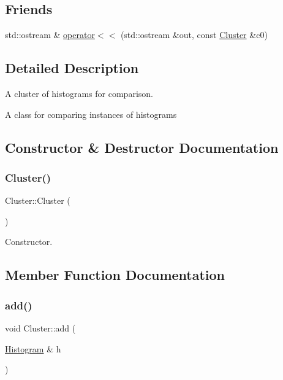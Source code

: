 \subsection*{Friends}
\begin{DoxyCompactItemize}
\item 
std\+::ostream \& \hyperlink{class_cluster_a80e9d0c8af3d3700176af496cc2dcf29}{operator$<$$<$} (std\+::ostream \&out, const \hyperlink{class_cluster}{Cluster} \&c0)
\end{DoxyCompactItemize}


\subsection{Detailed Description}
A cluster of histograms for comparison. 

A class for comparing instances of histograms 

\subsection{Constructor \& Destructor Documentation}
\mbox{\label{class_cluster_aee7feb1d599d4c8fda6c3ee83e86ba81}} 
\subsubsection{\texorpdfstring{Cluster()}{Cluster()}}
{\footnotesize\ttfamily Cluster\+::\+Cluster (\begin{DoxyParamCaption}{ }\end{DoxyParamCaption})\hspace{0.3cm}{\ttfamily [inline]}}



Constructor. 



\subsection{Member Function Documentation}
\mbox{\label{class_cluster_a410aab730d5fdf04b4ee8f230d0149e2}} 
\subsubsection{\texorpdfstring{add()}{add()}}
{\footnotesize\ttfamily void Cluster\+::add (\begin{DoxyParamCaption}\item[{\hyperlink{class_histogram}{Histogram} \&}]{h }\end{DoxyParamCaption})\hspace{0.3cm}{\ttfamily [inline]}}

